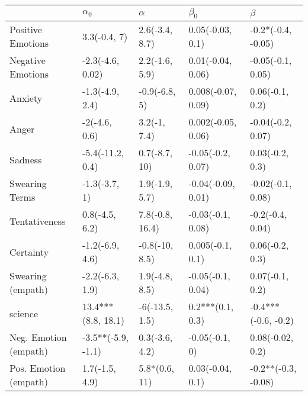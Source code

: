 \begin{tabular}{lllll}
\toprule
{} &          $\alpha_0$ &         $\alpha$ &           $\beta_0$ &              $\beta$ \\
\midrule
Positive Emotions     &        3.3(-0.4, 7) &   2.6(-3.4, 8.7) &    0.05(-0.03, 0.1) &   -0.2*(-0.4, -0.05) \\
Negative Emotions     &    -2.3(-4.6, 0.02) &   2.2(-1.6, 5.9) &   0.01(-0.04, 0.06) &    -0.05(-0.1, 0.05) \\
Anxiety               &     -1.3(-4.9, 2.4) &    -0.9(-6.8, 5) &  0.008(-0.07, 0.09) &      0.06(-0.1, 0.2) \\
Anger                 &       -2(-4.6, 0.6) &     3.2(-1, 7.4) &  0.002(-0.05, 0.06) &    -0.04(-0.2, 0.07) \\
Sadness               &    -5.4(-11.2, 0.4) &    0.7(-8.7, 10) &   -0.05(-0.2, 0.07) &      0.03(-0.2, 0.3) \\
Swearing Terms        &       -1.3(-3.7, 1) &   1.9(-1.9, 5.7) &  -0.04(-0.09, 0.01) &    -0.02(-0.1, 0.08) \\
Tentativeness         &      0.8(-4.5, 6.2) &  7.8(-0.8, 16.4) &   -0.03(-0.1, 0.08) &     -0.2(-0.4, 0.04) \\
Certainty             &     -1.2(-6.9, 4.6) &   -0.8(-10, 8.5) &    0.005(-0.1, 0.1) &      0.06(-0.2, 0.3) \\
Swearing (empath)     &     -2.2(-6.3, 1.9) &   1.9(-4.8, 8.5) &   -0.05(-0.1, 0.04) &      0.07(-0.1, 0.2) \\
science               &  13.4***(8.8, 18.1) &   -6(-13.5, 1.5) &    0.2***(0.1, 0.3) &  -0.4***(-0.6, -0.2) \\
Neg. Emotion (empath) &  -3.5**(-5.9, -1.1) &   0.3(-3.6, 4.2) &      -0.05(-0.1, 0) &     0.08(-0.02, 0.2) \\
Pos. Emotion (empath) &      1.7(-1.5, 4.9) &    5.8*(0.6, 11) &    0.03(-0.04, 0.1) &  -0.2**(-0.3, -0.08) \\
\bottomrule
\end{tabular}
